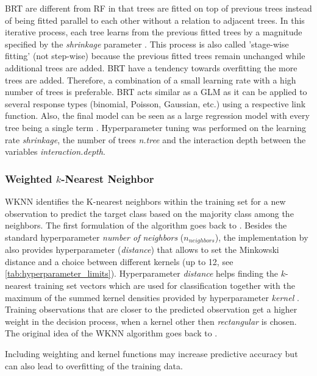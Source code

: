 \documentclass[review]{elsarticle}
\begin{document}
\ac{BRT} are different from \ac{RF} in that trees are fitted on top of previous trees instead of being fitted parallel to each other without a relation to adjacent trees.
In this iterative process, each tree learns from the previous fitted trees by a magnitude specified by the \textit{shrinkage} parameter \citep{Elith2008}.
This process is also called 'stage-wise fitting' (not step-wise) because the previous fitted trees remain unchanged while additional trees are added.
\ac{BRT} have a tendency towards overfitting the more trees are added.
Therefore, a combination of a small learning rate with a high number of trees is preferable.
\ac{BRT} acts similar as a \ac{GLM} as it can be applied to several response types (binomial, Poisson, Gaussian, etc.) using a respective link function.
Also, the final model can be seen as a large regression model with every tree being a single term \citep{Elith2008}.
Hyperparameter tuning was performed on the learning rate \textit{shrinkage}, the number of trees \textit{n.tree} and the interaction depth between the variables \textit{interaction.depth}.

\subsubsection{Weighted $k$-Nearest Neighbor}

\ac{WKNN} identifies the K-nearest neighbors within the training set for a new observation to predict the target class based on the majority class among the neighbors.
The first formulation of the algorithm goes back to \cite{Fix1951}.
Besides the standard hyperparameter \emph{number of neighbors} (\textit{$n_{neighbors}$}), the implementation by \cite{kknn} also provides hyperparameter (\textit{distance}) that allows to set the Minkowski distance and a choice between different kernels (up to 12, see \autoref{tab:hyperparameter_limits}).
Hyperparameter \textit{distance} helps finding the $k$-nearest training set vectors which are used for classification together with the maximum of the summed kernel densities provided by hyperparameter \textit{kernel} \citep{kknn}.
Training observations that are closer to the predicted observation get a higher weight in the decision process, when a kernel other then \emph{rectangular} is chosen.
The original idea of the \ac{WKNN} algorithm goes back to \cite{Dudani1976}.

Including weighting and kernel functions may increase predictive accuracy but can also lead to overfitting of the training data.
\end{document}
